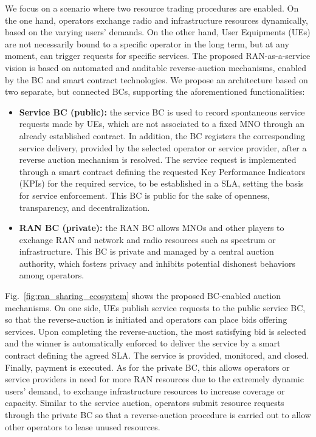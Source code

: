 \documentclass[conference]{IEEEtran}
\theoremstyle{definition}
\begin{document}
We focus on a scenario where two resource trading procedures are enabled. On the one hand, operators exchange radio and infrastructure resources dynamically, based on the varying users' demands. On the other hand, User Equipments (UEs) are not necessarily bound to a specific operator in the long term, but at any moment, can trigger requests for specific services. The proposed RAN-as-a-service vision is based on automated and auditable reverse-auction mechanisms, enabled by the BC and smart contract technologies. 
We propose an architecture based on two separate, but connected BCs, supporting the aforementioned functionalities:
\begin{itemize}
    \item \textbf{Service BC (public):} the service BC is used to record spontaneous service requests made by UEs, which are not associated to a fixed MNO through an already established contract. In addition, the BC registers the corresponding service delivery, provided by the selected operator or service provider, after a reverse auction mechanism is resolved. The service request is implemented through a smart contract defining the requested Key Performance Indicators (KPIs) for the required service, to be established in a SLA, setting the basis for service enforcement. This BC is public for the sake of openness, transparency, and decentralization.
    \item \textbf{RAN BC (private):} the RAN BC allows MNOs and other players to exchange RAN and network and radio resources such as spectrum or infrastructure. This BC is private and managed by a central auction authority, which fosters privacy and inhibits potential dishonest behaviors among operators.
\end{itemize}

Fig.~\ref{fig:ran_sharing_ecosystem} shows the proposed BC-enabled auction mechanisms. On one side, UEs publish service requests to the public service BC, so that the reverse-auction is initiated and operators can place bids offering services. Upon completing the reverse-auction, the most satisfying bid is selected and the winner is automatically enforced to deliver the service by a smart contract defining the agreed SLA. The service is provided, monitored, and closed. Finally, payment is executed. As for the private BC, this allows operators or service providers in need for more RAN resources due to the extremely dynamic users' demand, to exchange infrastructure resources to increase coverage or capacity. Similar to the service auction, operators submit resource requests through the private BC so that a reverse-auction procedure is carried out to allow other operators to lease unused resources. %
\end{document}

